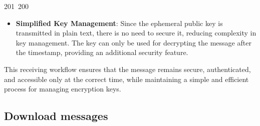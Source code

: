 201~200~\documentclass{article}
\begin{document}
\begin{itemize}
	                                                                                                                                                                                                                                                                                                	                                                                                                                \item \textbf{Simplified Key Management}: Since the ephemeral public key is transmitted in plain text, there is no need to secure it, reducing complexity in key management. The key can only be used for decrypting the message after the timestamp, providing an additional security feature.
	                                                                                                                                                                                                                                                                                                	                                                                                                                \end{itemize}

	                                                                                                                                                                                                                                                                                                	                                                                                                                This receiving workflow ensures that the message remains secure, authenticated, and accessible only at the correct time, while maintaining a simple and efficient process for managing encryption keys.


	                                                                                                                                                                                                                                                                                                	                                                                                                                \clearpage
	                                                                                                                                                                                                                                                                                                	                                                                                                                \subsection{Download messages}
\end{document}
